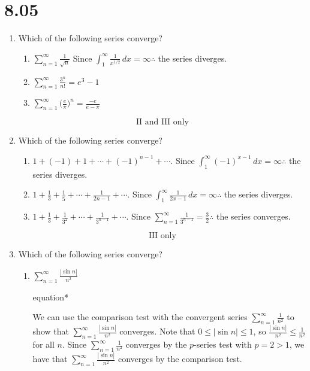 \documentclass[12pt]{article}
\begin{document}
\section*{8.05}
\begin{enumerate}
	\item Which of the following series converge?
	      \begin{enumerate}[label=\Roman*.]
	      	\item $\sum_{n=1}^{\infty} \frac{1}{\sqrt{n}}$ Since $\int_{1}^{\infty} \frac{1}{x^{1/2}} \, dx = \infty \therefore$ the series diverges.
	      	\item $\sum_{n=1}^{\infty} \frac{3^n}{n!} = e^3 -1$
	      	\item $\sum_{n=1}^{\infty} \big(\frac{e}{\pi}\big)^n = \frac{-e}{e-\pi}$
	      \end{enumerate}
		  $$\boxed{\text{II and III only}}$$
	\item Which of the following series converge?
	      \begin{enumerate}[label=\Roman*.]
	      	\item $1+(-1)+1+\cdots + (-1)^{n-1}+\cdots$. Since $\int_{1}^{\infty} (-1)^{x-1} \, dx = \infty \therefore$ the series diverges.
	      	\item $1+\frac{1}{3} + \frac{1}{5}+ \cdots + \frac{1}{2n-1}+\cdots$. Since $\int_{1}^{\infty} \frac{1}{2x-1} \, dx = \infty \therefore$ the series diverges.
	      	\item $1+\frac{1}{3} + \frac{1}{3^2} + \cdots + \frac{1}{3^{n-1}}+\cdots$. Since $\sum_{n=1}^{\infty} \frac{1}{3^{n-1}} = \frac{3}{2} \therefore$ the series converges.
	      \end{enumerate}
		  $$\boxed{\text{III only}}$$
	\item Which of the following series converge?
	      \begin{enumerate}[label=\Roman*.]
	      	\item $\sum_{n=1}^{\infty} \frac{|\sin n|}{n^2}$
			  	\begin{empheq}[box=\tcbhighmath]{equation*}
					\parbox{6in}{
						We can use the comparison test with the convergent series $\sum_{n=1}^{\infty} \frac{1}{n^2}$ to show that $\sum_{n=1}^{\infty} \frac{|\sin n|}{n^2}$ converges. Note that $0\leq |\sin n| \leq 1$, so $\frac{|\sin n|}{n^2} \leq \frac{1}{n^2}$ for all $n$. Since $\sum_{n=1}^{\infty} \frac{1}{n^2}$ converges by the $p$-series test with $p=2>1$, we have that $\sum_{n=1}^{\infty} \frac{|\sin n|}{n^2}$ converges by the comparison test.}
				\end{empheq}

\end{enumerate}
\end{enumerate}
\end{document}
